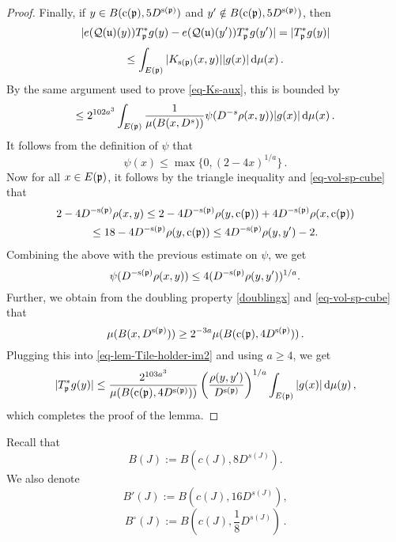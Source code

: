 \begin{proof}
        Finally, if $y \in B({\mathrm{c}}({\mathfrak p}), 5D^{{\mathrm{s}}({\mathfrak p})})$ and $y' \notin B({\mathrm{c}}({\mathfrak p}), 5D^{{\mathrm{s}}({\mathfrak p})})$, then
        $$
            |e({\mathcal{Q}}({\mathfrak u})(y)) T_{{\mathfrak p}}^* g(y) - e({\mathcal{Q}}({\mathfrak u})(y')) T_{{\mathfrak p}}^* g(y')| = |T_{{\mathfrak p}}^* g(y)|
        $$
        $$
            \le \int_{E({\mathfrak p})} |K_{{\mathrm{s}}({\mathfrak p})}(x,y)| |g(x)| \, \mathrm{d}\mu(x)\,.
        $$
        By the same argument used to prove \eqref{eq-Ks-aux}, this is bounded by
      \begin{equation}
            \label{eq-lem-Tile-holder-im2}
            \le 2^{102a^3} \int_{E({\mathfrak p})} \frac{1}{\mu(B(x, D^s))} \psi(D^{-s} \rho(x,y)) |g(x)| \, \mathrm{d}\mu(x)\,.
        \end{equation}
        It follows from the definition of $\psi$ that
        $$
            \psi(x) \le \max\{0, (2 - 4x)^{1/a}\}\,.
        $$
        Now for all $x\in E({\mathfrak p})$, it follows by the triangle inequality and \eqref{eq-vol-sp-cube} that
        \begin{multline*}
        2 - 4D^{-{\mathrm{s}}({\mathfrak p})}\rho(x,y)\leq 2 - 4D^{-{\mathrm{s}}({\mathfrak p})}\rho(y, {\mathrm{c}}({\mathfrak p})) + 4 D^{-{\mathrm{s}}({\mathfrak p})}\rho(x, {\mathrm{c}}({\mathfrak p}))\\\leq 18 - 4 D^{-{\mathrm{s}}({\mathfrak p})} \rho(y, {\mathrm{c}}({\mathfrak p})) \leq 4 D^{-{\mathrm{s}}({\mathfrak p})}\rho(y,y') - 2 .
        \end{multline*}
        Combining the above with the previous estimate on $\psi$, we get
        $$
            \psi(D^{-{\mathrm{s}}({\mathfrak p})}\rho(x,y)) \le 4 (D^{-{\mathrm{s}}({\mathfrak p})}\rho(y,y'))^{1/a}.
        $$
        Further, we obtain from the doubling property \eqref{doublingx} and \eqref{eq-vol-sp-cube} that
        $$
            \mu(B(x, D^{{\mathrm{s}}({\mathfrak p})})) \ge 2^{-3a} \mu(B({\mathrm{c}}({\mathfrak p}), 4D^{{\mathrm{s}}({\mathfrak p})}))\,.
        $$
        Plugging this into \eqref{eq-lem-Tile-holder-im2} and using $a \ge 4$, we get
        $$
            |T_{{\mathfrak p}}^* g(y)| \le \frac{2^{103a^3}}{\mu(B({\mathrm{c}}({\mathfrak p}), 4D^{{\mathrm{s}}({\mathfrak p})}))} \left(\frac{\rho(y,y')}{D^{{\mathrm{s}}({\mathfrak p})}}\right)^{1/a} \int_{E({\mathfrak p})} |g(x)| \, \mathrm{d}\mu(y)\,,
        $$
        which completes the proof of the lemma.
    \end{proof}

    Recall that
    \begin{equation*}
        B(J) := B(c(J), 8D^{s(J)}).
    \end{equation*}
    We also denote
    \begin{equation*}
     B'(J) := B(c(J), 16D^{s(J)}),
    \end{equation*}
    \begin{equation*}
     B^\circ{}(J) := B(c(J), \frac{1}{8}D^{s(J)})\, .
    \end{equation*}



